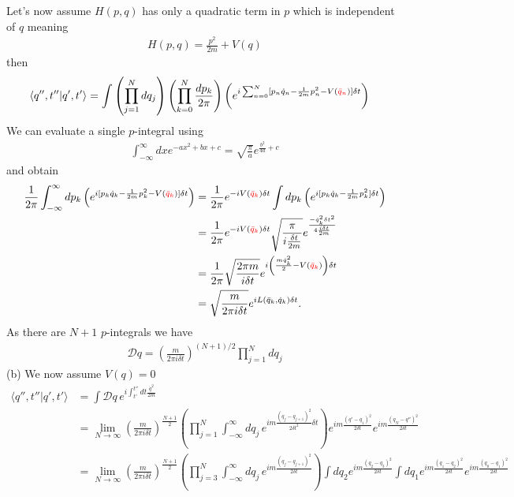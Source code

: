 \documentclass[10pt,a4paper]{article}
\theoremstyle{definition}
\begin{document}
Let's now assume $H(p,q)$ has only a quadratic term in $p$ which is independent of $q$ meaning
\begin{align}
    H(p,q)=\frac{p^2}{2m}+V(q)
\end{align}
then
\begin{align}
\langle q'',t''|q',t'\rangle
        &=\int\left(\prod_{j=1}^N dq_j\right)\left(\prod_{k=0}^{N}\frac{dp_k}{2\pi}\right) \left(e^{i\sum_{n=0}^N[p_n\dot{q}_n-\frac{1}{2m}p_n^2-V(\textcolor{red}{\bar{q}_n})]\delta t}\right)
\end{align}
We can evaluate a single $p$-integral using
\begin{align}
    \int_{-\infty}^\infty dx e^{-ax^2+bx+c}=\sqrt{\frac{\pi}{a}}e^{\frac{b^2}{4a}+c}
\end{align}
and obtain
\begin{align}
        \frac{1}{2\pi}\int_{-\infty}^\infty dp_k \left(e^{i[p_k\dot{q}_k-\frac{1}{2m}p_k^2-V(\textcolor{red}{\bar{q}_k})]\delta t}\right)
        &=\frac{1}{2\pi}e^{-iV(\textcolor{red}{\bar{q}_k})\delta t}\int dp_k \left(e^{i[p_k\dot{q}_k-\frac{1}{2m}p_k^2]\delta t}\right)\\
        &=\frac{1}{2\pi}e^{-iV(\textcolor{red}{\bar{q}_k})\delta t}\sqrt{\frac{\pi}{i\frac{\delta t}{2m}}} e^{\frac{-\dot{q}_k^2\delta t^2}{4\frac{i\delta t}{2m}}}\\
        &=\frac{1}{2\pi}\sqrt{\frac{2\pi m}{i\delta t}} e^{i\left(\frac{m\dot{q}_k^2}{2}-V(\textcolor{red}{\bar{q}_k})\right)\delta t}\\
        &=\sqrt{\frac{m}{2\pi i\delta t}} e^{iL(\bar{q}_k,\dot{q}_k)\delta t}.
\end{align}
As there are $N+1$ $p$-integrals we have
\begin{align}
    \mathcal{D}q=\left(\frac{m}{2\pi i\delta t}\right)^{(N+1)/2}\prod_{j=1}^N dq_j
\end{align}
(b) We now assume $V(q)=0$
\begin{align}
\langle q'',t''|q',t'\rangle
&=\int\mathcal{D}q\,e^{i\int_{t'}^{t''}dt\frac{\dot{q}^2}{2m}}\\
&=\lim_{N\rightarrow\infty}\left(\frac{m}{2\pi i\delta t}\right)^\frac{N+1}{2}\left(\prod_{j=1}^N \int_{-\infty}^{\infty}dq_j\, e^{im\frac{(q_j-q_{j+1})^2}{2\delta t^2}\delta t}\right)e^{im\frac{(q'-q_1)^2}{2\delta t}}e^{im\frac{(q_N-q'')^2}{2\delta t}}\\
&=\lim_{N\rightarrow\infty}\left(\frac{m}{2\pi i\delta t}\right)^\frac{N+1}{2}\left(\prod_{j=3}^N \int_{-\infty}^{\infty}dq_j\, e^{im\frac{(q_j-q_{j+1})^2}{2\delta t}}\right)\int dq_2e^{im\frac{(q_2-q_3)^2}{2\delta t}}\int dq_1e^{im\frac{(q_1-q_2)^2}{2\delta t}}e^{im\frac{(q_0-q_1)^2}{2\delta t}}
\end{align}
\end{document}

